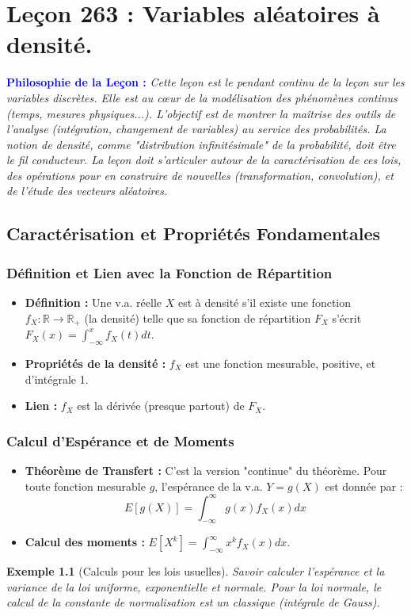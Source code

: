 \documentclass[12pt, a4paper, parskip=full]{report}
\theoremstyle{agregstyle}
\newtheorem{example}[definition]{Exemple}
\newenvironment{philosophie}
  {\par\medskip\noindent\begin{oframed}\noindent\textbf{\textcolor{blue}{Philosophie de la Leçon :}}\itshape}
  {\end{oframed}\par\medskip}
\begin{document}
\chapter{Leçon 263 : Variables aléatoires à densité.}

\begin{philosophie}
    Cette leçon est le pendant continu de la leçon sur les variables discrètes. Elle est au cœur de la modélisation des phénomènes continus (temps, mesures physiques...). L'objectif est de montrer la maîtrise des outils de l'analyse (intégration, changement de variables) au service des probabilités. La notion de densité, comme "distribution infinitésimale" de la probabilité, doit être le fil conducteur. La leçon doit s'articuler autour de la caractérisation de ces lois, des opérations pour en construire de nouvelles (transformation, convolution), et de l'étude des vecteurs aléatoires.
\end{philosophie}

\section{Caractérisation et Propriétés Fondamentales}
\subsection{Définition et Lien avec la Fonction de Répartition}
\begin{itemize}
    \item \textbf{Définition :} Une v.a. réelle $X$ est à densité s'il existe une fonction $f_X: \mathbb{R} \to \mathbb{R}_+$ (la densité) telle que sa fonction de répartition $F_X$ s'écrit $F_X(x) = \int_{-\infty}^x f_X(t)dt$.
    \item \textbf{Propriétés de la densité :} $f_X$ est une fonction mesurable, positive, et d'intégrale 1.
    \item \textbf{Lien :} $f_X$ est la dérivée (presque partout) de $F_X$.
\end{itemize}
\subsection{Calcul d'Espérance et de Moments}
\begin{itemize}
    \item \textbf{Théorème de Transfert :} C'est la version "continue" du théorème. Pour toute fonction mesurable $g$, l'espérance de la v.a. $Y=g(X)$ est donnée par :
    $$ E[g(X)] = \int_{-\infty}^{\infty} g(x) f_X(x) dx $$
    \item \textbf{Calcul des moments :} $E[X^k] = \int_{-\infty}^{\infty} x^k f_X(x) dx$.
\end{itemize}
\begin{example}[Calculs pour les lois usuelles]
    Savoir calculer l'espérance et la variance de la loi uniforme, exponentielle et normale. Pour la loi normale, le calcul de la constante de normalisation est un classique (intégrale de Gauss).
\end{example}
\end{document}
